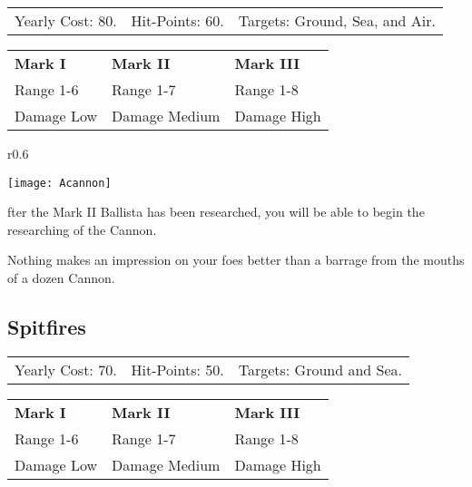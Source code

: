 
\begin{tabular}{p{1.264in} p{1.264in} p{1.264in}}
    Yearly Cost: 80. & Hit-Points: 60. & Targets: Ground, Sea, and Air.
\end{tabular}

\begin{tabular}{| p{1.264in} p{1.264in} p{1.264in}|}
    \hline
    \textbf{Mark I}    & \textbf{Mark II} & \textbf{Mark III} \\ 
    Range 1-6 & Range 1-7 & Range 1-8 \\ 
    Damage Low & Damage Medium & Damage High \\ 
    \hline
\end{tabular}
   
\begin{wrapfigure}{r}{0.6\textwidth}
    \vspace{-20pt}
    \begin{center}
        \texttt{[image: Acannon]} %
    \end{center}
    \vspace{-50pt}
\end{wrapfigure}

fter the Mark II Ballista has been researched, you will be able to begin the researching of the Cannon.

Nothing makes an impression on your foes better than a barrage from the mouths of a dozen Cannon.

\clearpage  %

\subsection{\textsf{Spitfires}}


\begin{tabular}{p{1.264in} p{1.264in} p{1.264in}}
    Yearly Cost: 70. & Hit-Points: 50. & Targets: Ground and Sea.
\end{tabular}

\begin{tabular}{| p{1.264in} p{1.264in} p{1.264in}|}
    \hline
    \textbf{Mark I}    & \textbf{Mark II} & \textbf{Mark III} \\ 
    Range 1-6 & Range 1-7 & Range 1-8 \\ 
    Damage Low & Damage Medium & Damage High \\ 
    \hline
\end{tabular}

